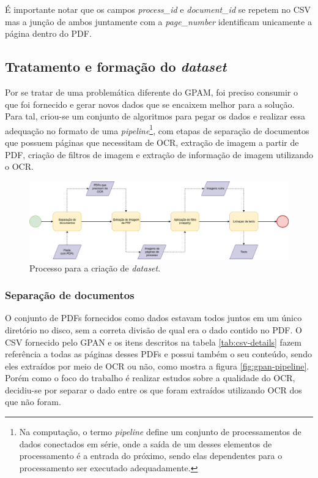 É importante notar que os campos \textit{process\_id} e \textit{document\_id} se repetem no CSV mas a junção de ambos juntamente com a \textit{page\_number} identificam unicamente a página dentro do PDF.

\subsection{Tratamento e formação do \textit{dataset}}

Por se tratar de uma problemática diferente do GPAM, foi preciso consumir o que foi fornecido e gerar novos dados que se encaixem melhor para a solução. Para tal, criou-se um conjunto de algoritmos para pegar os dados e realizar essa adequação no formato de uma \textit{pipeline}\footnote{
  Na computação, o termo \textit{pipeline} define um conjunto de processamentos de dados conectados em série, onde a saída de um desses elementos de processamento é a entrada do próximo, sendo elas dependentes para o processamento ser executado adequadamente.
}, com etapas de separação de documentos que possuem páginas que necessitam de OCR, extração de imagem a partir de PDF, criação de filtros de imagem e extração de informação de imagem utilizando o OCR.

\begin{figure}[H]
  \includegraphics[width=\linewidth, rotate=0, center]{figuras/crappy-flow-diagram.png}
  \caption{Processo para a criação de \textit{dataset}.}
\end{figure}

\subsubsection{Separação de documentos}
O conjunto de PDFs fornecidos como dados estavam todos juntos em um único diretório no disco, sem a correta divisão de qual era o dado contido no PDF. O CSV fornecido pelo GPAN e os itens descritos na tabela \ref{tab:csv-details} fazem referência a todas as páginas desses PDFs e possui também o seu conteúdo, sendo eles extraídos por meio de OCR ou não, como mostra a figura \ref{fig:gpan-pipeline}. Porém como o foco do trabalho é realizar estudos sobre a qualidade do OCR, decidiu-se por separar o dado entre os que foram extraídos utilizando OCR dos que não foram.

